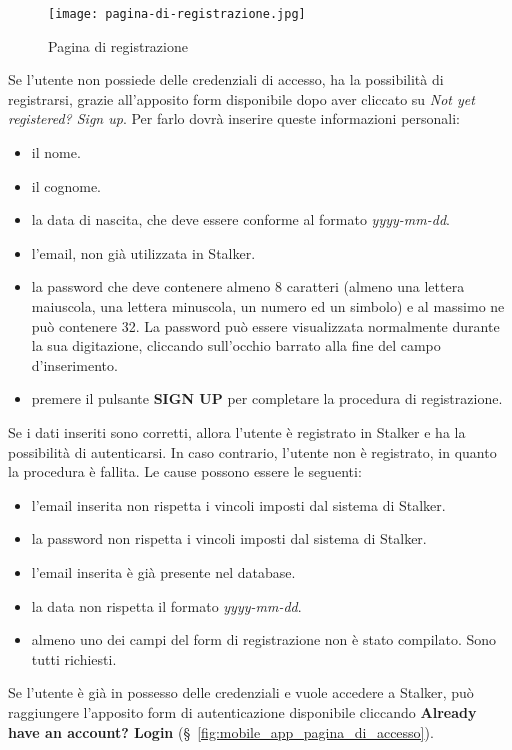 \documentclass[../manuale-utente.tex]{subfiles}
\begin{document}
\begin{figure}[H]
    \centering
    \texttt{[image: pagina-di-registrazione.jpg]}
    \caption{Pagina di registrazione}%
    \label{fig:mobile_app_pagina_di_registrazione}
\end{figure}
Se l'utente non possiede delle credenziali di accesso, ha la possibilità di registrarsi, grazie all'apposito form disponibile dopo aver cliccato su \textit{Not yet registered? Sign up}. Per farlo dovrà inserire queste informazioni personali:
\begin{itemize}
    \item il nome.
    \item il cognome.
    \item la data di nascita, che deve essere conforme al formato \textit{yyyy-mm-dd}.
    \item l'email, non già utilizzata in Stalker.
    \item la password che deve contenere almeno 8 caratteri (almeno una lettera maiuscola, una lettera minuscola, un numero ed un simbolo) e al massimo ne può contenere 32. La password può essere visualizzata normalmente durante la sua digitazione, cliccando sull'occhio barrato alla fine del campo d'inserimento.
    \item premere il pulsante \textbf{SIGN UP} per completare la procedura di registrazione.
\end{itemize}
Se i dati inseriti sono corretti, allora l'utente è registrato in Stalker e ha la possibilità di autenticarsi.
In caso contrario, l'utente non è registrato, in quanto la procedura è fallita.
Le cause possono essere le seguenti:
\begin{itemize}
    \item l'email inserita non rispetta i vincoli imposti dal sistema di Stalker.
    \item la password non rispetta i vincoli imposti dal sistema di Stalker.
    \item l'email inserita è già presente nel database.
    \item la data non rispetta il formato \textit{yyyy-mm-dd}.
    \item almeno uno dei campi del form di registrazione non è stato compilato. Sono tutti richiesti.
\end{itemize}
Se l'utente è già in possesso delle credenziali e vuole accedere a Stalker, può raggiungere l'apposito form di autenticazione disponibile cliccando \textbf{Already have an account? Login} (§~\ref{fig:mobile_app_pagina_di_accesso}).
\end{document}
